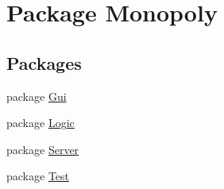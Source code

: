 \hypertarget{namespace_monopoly}{}\section{Package Monopoly}
\label{namespace_monopoly}
\subsection*{Packages}
\begin{DoxyCompactItemize}
\item 
package \hyperlink{namespace_monopoly_1_1_gui}{Gui}
\item 
package \hyperlink{namespace_monopoly_1_1_logic}{Logic}
\item 
package \hyperlink{namespace_monopoly_1_1_server}{Server}
\item 
package \hyperlink{namespace_monopoly_1_1_test}{Test}
\end{DoxyCompactItemize}
